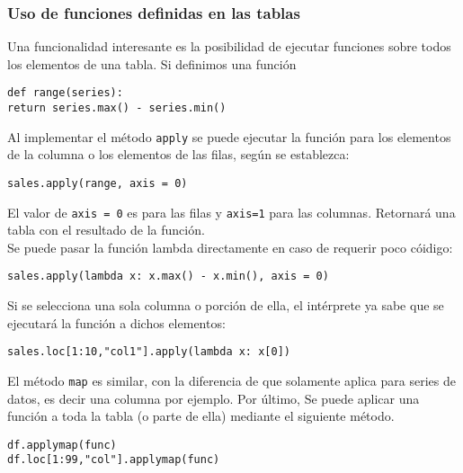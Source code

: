 \subsubsection{Uso de funciones definidas en las tablas}
\noindent Una funcionalidad interesante es la posibilidad de ejecutar funciones sobre todos los elementos de una tabla. Si definimos una función 
\begin{verbatim}
def range(series):
return series.max() - series.min()
\end{verbatim}
\noindent Al implementar el método \texttt{apply} se puede ejecutar la función para los elementos de la columna o los elementos de las filas, según se establezca:
\begin{verbatim}
sales.apply(range, axis = 0)
\end{verbatim}
El valor de \texttt{axis = 0} es para las filas y \texttt{axis=1} para las columnas. Retornará una tabla con el resultado de la función. \\
\noindent Se puede pasar la función lambda directamente en caso de requerir poco cóidigo:
\begin{verbatim}
sales.apply(lambda x: x.max() - x.min(), axis = 0)
\end{verbatim}
Si se selecciona una sola columna o porción de ella, el intérprete ya sabe que se ejecutará la función a dichos elementos:
\begin{verbatim}
sales.loc[1:10,"col1"].apply(lambda x: x[0])
\end{verbatim}
\noindent El método \texttt{map} es similar, con la diferencia de que solamente aplica para series de datos, es decir una columna por ejemplo. Por último, Se puede aplicar una función a toda la tabla (o parte de ella) mediante el siguiente método.
\begin{verbatim}
df.applymap(func)
df.loc[1:99,"col"].applymap(func)
\end{verbatim}
